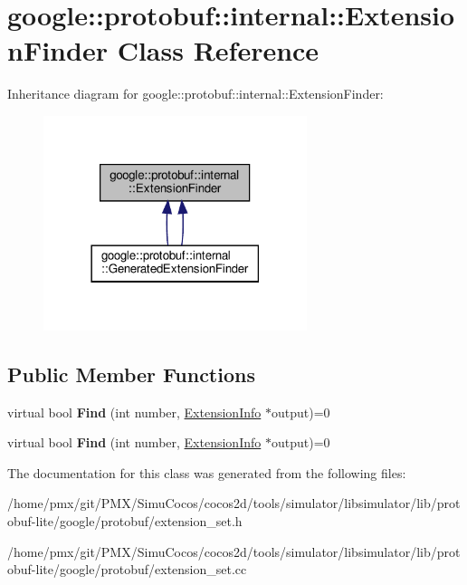 \hypertarget{classgoogle_1_1protobuf_1_1internal_1_1ExtensionFinder}{}\section{google\+:\+:protobuf\+:\+:internal\+:\+:Extension\+Finder Class Reference}
\label{classgoogle_1_1protobuf_1_1internal_1_1ExtensionFinder}


Inheritance diagram for google\+:\+:protobuf\+:\+:internal\+:\+:Extension\+Finder\+:
\nopagebreak
\begin{figure}[H]
\begin{center}
\leavevmode
\includegraphics[width=218pt]{classgoogle_1_1protobuf_1_1internal_1_1ExtensionFinder__inherit__graph}
\end{center}
\end{figure}
\subsection*{Public Member Functions}
\begin{DoxyCompactItemize}
\item 
\mbox{\label{classgoogle_1_1protobuf_1_1internal_1_1ExtensionFinder_a6b724d9bb985bdc24adb836e8cb26f50}} 
virtual bool {\bfseries Find} (int number, \hyperlink{structgoogle_1_1protobuf_1_1internal_1_1ExtensionInfo}{Extension\+Info} $\ast$output)=0
\item 
\mbox{\label{classgoogle_1_1protobuf_1_1internal_1_1ExtensionFinder_a6b724d9bb985bdc24adb836e8cb26f50}} 
virtual bool {\bfseries Find} (int number, \hyperlink{structgoogle_1_1protobuf_1_1internal_1_1ExtensionInfo}{Extension\+Info} $\ast$output)=0
\end{DoxyCompactItemize}


The documentation for this class was generated from the following files\+:\begin{DoxyCompactItemize}
\item 
/home/pmx/git/\+P\+M\+X/\+Simu\+Cocos/cocos2d/tools/simulator/libsimulator/lib/protobuf-\/lite/google/protobuf/extension\+\_\+set.\+h\item 
/home/pmx/git/\+P\+M\+X/\+Simu\+Cocos/cocos2d/tools/simulator/libsimulator/lib/protobuf-\/lite/google/protobuf/extension\+\_\+set.\+cc\end{DoxyCompactItemize}
